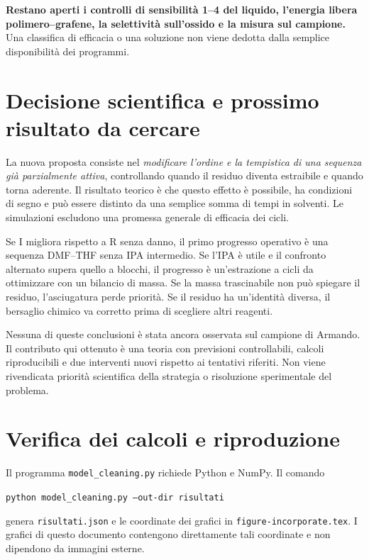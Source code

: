 \documentclass[11pt,reqno]{amsart}
\numberwithin{equation}{section}
\begin{document}
\textbf{Restano aperti i controlli di sensibilit\`a 1--4 del liquido,
l'energia libera polimero--grafene, la selettivit\`a sull'ossido e
la misura sul campione.} Una classifica di efficacia o una soluzione
non viene dedotta dalla semplice disponibilit\`a dei programmi.

\section{Decisione scientifica e prossimo risultato da cercare}

La nuova proposta consiste nel \emph{modificare l'ordine e la
tempistica di una sequenza gi\`a parzialmente attiva}, controllando
quando il residuo diventa estraibile e quando torna aderente.
Il risultato teorico \`e che questo effetto \`e possibile, ha
condizioni di segno e pu\`o essere distinto da una semplice
somma di tempi in solventi. Le simulazioni escludono una
promessa generale di efficacia dei cicli.

Se I migliora rispetto a R senza danno, il primo progresso
operativo \`e una sequenza DMF--THF senza IPA intermedio.
Se l'IPA \`e utile e il confronto alternato supera quello
a blocchi, il progresso \`e un'estrazione a cicli da ottimizzare
con un bilancio di massa. Se la massa trascinabile non pu\`o
spiegare il residuo, l'asciugatura perde priorit\`a. Se il
residuo ha un'identit\`a diversa, il bersaglio chimico va
corretto prima di scegliere altri reagenti.

Nessuna di queste conclusioni \`e stata ancora osservata sul
campione di Armando. Il contributo qui ottenuto \`e una teoria
con previsioni controllabili, calcoli riproducibili e due
interventi nuovi rispetto ai tentativi riferiti. Non viene
rivendicata priorit\`a scientifica della strategia o risoluzione
sperimentale del problema.

\appendix
\section{Verifica dei calcoli e riproduzione}

Il programma \texttt{model\_cleaning.py} richiede Python e NumPy.
Il comando
\begin{center}
\texttt{python model\_cleaning.py --out-dir risultati}
\end{center}
genera \texttt{risultati.json} e le coordinate dei grafici
in \texttt{figure-incorporate.tex}. I grafici di questo
documento contengono direttamente tali coordinate e non
dipendono da immagini esterne.
\end{document}
